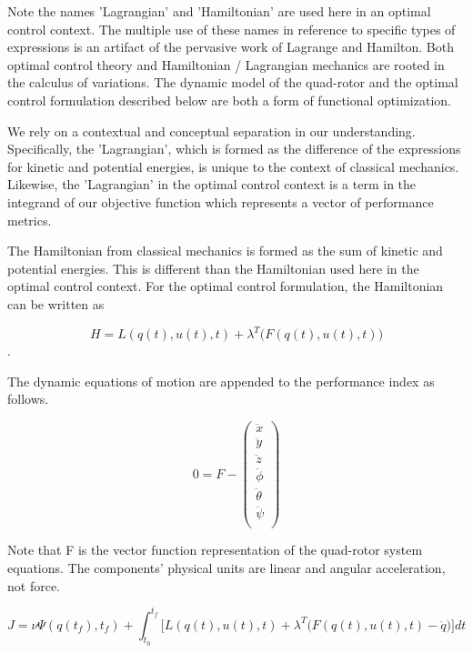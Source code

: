 Note the names 'Lagrangian' and 'Hamiltonian' are used here in an optimal control context. The multiple use of these names in reference to specific types of expressions is an artifact of the pervasive work of Lagrange and Hamilton. Both optimal control theory and Hamiltonian / Lagrangian mechanics are rooted in the calculus of variations. The dynamic model of the quad-rotor and the optimal control formulation described below are both a form of functional optimization.


 We rely on a contextual and conceptual separation in our understanding. Specifically, the 'Lagrangian', which is formed as the difference of the expressions for kinetic and potential energies, is unique to the context of classical mechanics. Likewise, the 'Lagrangian' in the optimal control context is a term in the integrand of our objective function which represents a vector of performance metrics. 

The Hamiltonian from classical mechanics is formed as the sum of kinetic and potential energies. This is different than the Hamiltonian used here in the optimal control context. For the optimal control formulation, the Hamiltonian can be written as 


\begin{equation}
    H = L(q(t),u(t),t) + \lambda^T \big( F(q(t),u(t),t) \big)
\end{equation}.

      
The dynamic equations of motion are appended to the performance index as follows.

\begin{equation}
    0 = F - \left( 
        \begin{array}{c}
           \ddot{x}\\
           \ddot{y}\\
           \ddot{z}\\        
            \ddot{\phi}\\
            \ddot{\theta}\\
            \ddot{\psi}\\
        \end{array}\right) 
\end{equation}

Note that F is the vector function representation of the quad-rotor system equations. The components' physical units are linear and angular acceleration, not force.

\begin{equation}
    J = \nu \Psi ( q(t_f),t_f ) + \int_{t_0}^{t_f}  \big[ L(q(t),u(t),t) + \lambda^T \big( F(q(t),u(t),t) - \ddot q \big)  \big] dt 
\end{equation}

